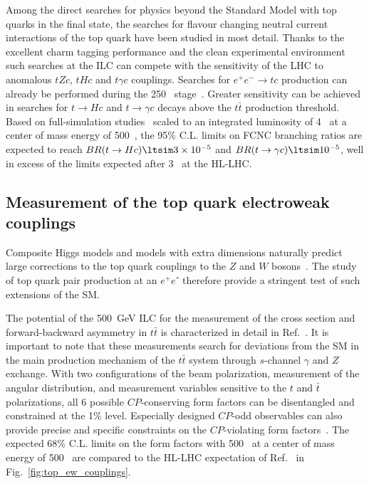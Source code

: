 Among the direct searches for physics beyond the Standard Model with top quarks 
in the final state, the searches for flavour changing neutral current interactions of 
the top quark have been studied in most detail. Thanks to the excellent charm
tagging performance and the clean experimental environment such searches at the ILC
can compete with the sensitivity of the LHC to anomalous $ t Z c$, $t H c$ and 
$t\gamma c$ couplings. Searches for $e^+e^- \rightarrow t c$ production can
already be performed during the 250~\GeV{} stage~\cite{Hesari:2014eua}. Greater sensitivity can be achieved in searches for $t \rightarrow Hc$ and 
$t\rightarrow \gamma c$ decays above the $t\bar{t}$ production threshold.
Based on full-simulation studies~\cite{Zarnecki:2018wsw, Abramowicz:2018rjq} 
scaled to an integrated luminosity of 4~\iab{} 
at a center of mass energy of 500~\GeV{}{}, the 95\% C.L. limits on FCNC branching
ratios are expected to reach $BR(t \rightarrow Hc) \ltsim 3 \times 10^{-5}$ and 
$BR(t \rightarrow \gamma c) \ltsim 10^{-5}$, well in excess of the 
limits expected after 3~\iab{} at the HL-LHC. 


\subsection{Measurement of the top quark electroweak couplings}
\label{subsec:top:topelectroweak}

Composite Higgs models and models with extra dimensions naturally
predict  large corrections to the top quark couplings to the $Z$ and
$W$ bosons~\cite{Richard:2014upa,Barducci:2015aoa,Durieux:2018ekg}.
The study of top quark pair production at an $e^+e⁻$ therefore provide
a stringent test of such extensions of the SM.

The potential of the 500~GeV ILC for the measurement of the cross section and forward-backward asymmetry in
$t\bar{t}$ is characterized in detail in Ref.~\cite{Amjad:2015mma}. It
is important to note that these measurements search for deviations
from the SM in the main production mechanism of the $t\bar t$ system
through $s$-channel $\gamma$ and $Z$ exchange.   With two
configurations of the beam polarization, measurement of the angular
distribution, and measurement variables sensitive to the $t$ and $\bar
t$ polarizations, all 6 possible $CP$-conserving form factors can be
disentangled and constrained at the 1\% level. 
Especially designed $CP$-odd observables can also provide precise and
specific constraints on the $CP$-violating form factors~\cite{Bernreuther:2017cyi}. 
The expected 68\% C.L. limits on the form factors with 500~\ifb{} at
a center of mass energy of 500~\GeV{} are compared to the HL-LHC
expectation of Ref.~\cite{Baur:2004uw,Baur:2005wi} in Fig.~\ref{fig:top_ew_couplings}.

